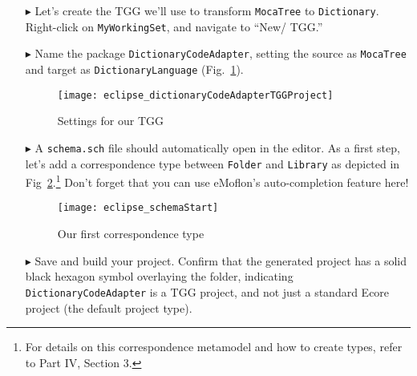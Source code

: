 \begin{enumerate}

\item[$\blacktriangleright$] Let's create the TGG we'll use to transform \texttt{MocaTree} to \texttt{Dictionary}. Right-click on \texttt{MyWorkingSet}, and
navigate to ``New/ TGG.''

\item[$\blacktriangleright$] Name the package \texttt{DictionaryCodeAdapter}, setting the source as \texttt{MocaTree} and target as \texttt{DictionaryLanguage}
(Fig.~\ref{eclipse:newTGGProject}).

\begin{figure}[htbp]
\begin{center}
  \texttt{[image: eclipse\_dictionaryCodeAdapterTGGProject]}
  \caption{Settings for our TGG}
  \label{eclipse:newTGGProject}
\end{center}
\end{figure}

\item[$\blacktriangleright$] A \texttt{schema.sch} file should automatically open in the editor. As a first step, let's add a correspondence type
between \texttt{Folder} and \texttt{Library} as depicted in Fig~\ref{eclipse:firstSchema}.\footnote{For details on this correspondence metamodel and how to
create types, refer to Part IV, Section 3.} Don't forget that you can use eMoflon's auto-completion feature here!

\begin{figure}[htbp]
\begin{center}
  \texttt{[image: eclipse\_schemaStart]}
  \caption{Our first correspondence type}
  \label{eclipse:firstSchema}
\end{center}
\end{figure}

\item[$\blacktriangleright$] Save and build your project. Confirm that the generated project has a solid black hexagon symbol overlaying the folder, indicating
\texttt{DictionaryCodeAdapter} is a TGG project, and not just a standard Ecore project (the default project type).

\end{enumerate}
